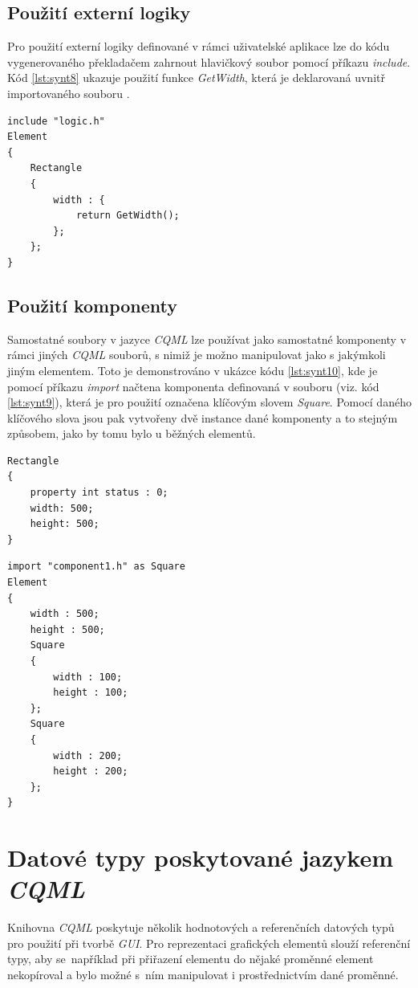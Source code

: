 \documentclass{article}
\begin{document}
\subsection{Použití externí logiky}
Pro použití externí logiky definované v rámci uživatelské aplikace lze do kódu vygenerovaného překladačem zahrnout hlavičkový soubor pomocí příkazu \textit{include}. Kód \ref{lst:synt8} ukazuje použití funkce \textit{GetWidth}, která je deklarovaná uvnitř importovaného souboru .
\begin{lstlisting}[frame=single,caption=Ukázka kódu používajícího externí funkci deklarovanou v hlavičkovém souboru.,label=lst:synt8]
include "logic.h"
Element
{
	Rectangle
	{
		width : {
			return GetWidth();
		};
	};
}
\end{lstlisting}


\subsection{Použití komponenty}
Samostatné soubory v jazyce \textit{CQML} lze používat jako samostatné komponenty v rámci jiných \textit{CQML} souborů, s nimiž je možno manipulovat jako s jakýmkoli jiným elementem. Toto je demonstrováno v ukázce kódu \ref{lst:synt10}, kde je pomocí příkazu \textit{import} načtena komponenta definovaná v souboru  (viz. kód \ref{lst:synt9}), která je pro použití označena klíčovým slovem \textit{Square}. Pomocí daného klíčového slova jsou pak vytvořeny dvě instance dané komponenty a to stejným způsobem, jako by tomu bylo u běžných elementů.
\begin{lstlisting}[float,frame=single,caption=Zdrojový soubor komponenty.,label=lst:synt9]
Rectangle
{
	property int status : 0;
	width: 500;
	height: 500;
}
\end{lstlisting}


\begin{lstlisting}[frame=single,caption=Ukázka použití komponenty z jiného souboru.,label=lst:synt10]
import "component1.h" as Square
Element
{
	width : 500;
	height : 500;
	Square
	{
		width : 100;
		height : 100;
	};
	Square
	{
		width : 200;
		height : 200;
	};
}
\end{lstlisting}



\section[Datové typy \textit{CQML}]{\label{CH:APC}Datové typy poskytované jazykem \textit{CQML}}
Knihovna \textit{CQML} poskytuje několik hodnotových a referenčních datových typů pro použití při tvorbě \textit{GUI}. Pro reprezentaci grafických elementů slouží referenční typy, aby se~například při přiřazení elementu do nějaké proměnné element nekopíroval a bylo možné s~ním manipulovat i prostřednictvím dané proměnné.
\end{document}

